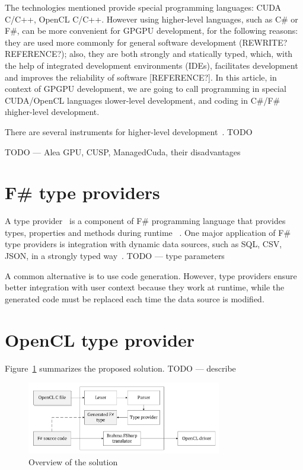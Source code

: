\documentclass[sigplan,review]{acmart}\settopmatter{printfolios=true}
\begin{document}
The technologies mentioned provide special programming languages: CUDA C/C++, OpenCL C/C++. However using higher-level languages, such as C\# or F\#, can be more convenient for GPGPU development, for the following reasons: they are used more commonly for general software development (REWRITE? REFERENCE?); also, they are both strongly and statically typed, which, with the help of integrated development environments (IDEs), facilitates development and improves the reliability of software [REFERENCE?]. In this article, in context of GPGPU development, we are going to call programming in special CUDA/OpenCL languages \i{lower-level development}, and coding in C\#/F\# \i{higher-level development}.

There are several instruments for higher-level development~\cite{Brahma_FSharp, FSCL, AleaGPU}. TODO

TODO --- Alea GPU, CUSP, ManagedCuda, their disadvantages


\section{F\# type providers}

A type provider~\cite{syme2012strongly} is a component of F\# programming language that provides types, properties and methods during runtime ~\cite{TypeProviders}. One major application of F\# type providers is integration with dynamic data sources, such as SQL, CSV, JSON, in a strongly typed way~\cite{FSharpData}. TODO --- type parameters

A common alternative is to use code generation. However, type providers ensure better integration with user context because they work at runtime, while the generated code must be replaced each time the data source is modified.

\section{OpenCL type provider}

Figure~\ref{architecture} summarizes the proposed solution. TODO --- describe

\begin{figure}[h]
\centering
\includegraphics[width=8.5cm]{graphics/architecture.pdf}
\caption{Overview of the solution}
\label{architecture}
\end{figure}
\end{document}
